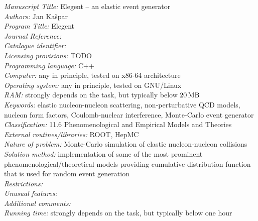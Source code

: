\documentclass[preprint,12pt]{elsarticle}
\def\un#1{{\,\rm #1}}
\begin{document}
\begin{small}
\noindent
{\em Manuscript Title:} Elegent -- an elastic event generator\\
{\em Authors:} Jan Ka\v spar\\
{\em Program Title:} Elegent\\
{\em Journal Reference:}\\ %
{\em Catalogue identifier:}\\ %
{\em Licensing provisions:} TODO\\ %
{\em Programming language:} C++\\
{\em Computer:} any in principle, tested on x86-64 architecture\\
{\em Operating system:} any in principle, tested on GNU/Linux\\
{\em RAM:} strongly depends on the task, but typically below $20\un{MB}$\\ %
{\em Keywords:} elastic nucleon-nucleon scattering, non-perturbative QCD models, nucleon form factors, Coulomb-nuclear interference, Monte-Carlo event generator\\ %
{\em Classification:} 11.6 Phenomenological and Empirical Models and Theories\\ %
{\em External routines/libraries:} ROOT, HepMC\\ %
{\em Nature of problem:} Monte-Carlo simulation of elastic nucleon-nucleon collisions\\%
{\em Solution method:} implementation of some of the most prominent phenomenological/theoretical models providing cumulative distribution function that is used for random event generation\\ %
{\em Restrictions:}\\ %
{\em Unusual features:}\\ %
{\em Additional comments:}\\ %
{\em Running time:} strongly depends on the task, but typically below one hour\\ %
\end{small}
\end{document}
